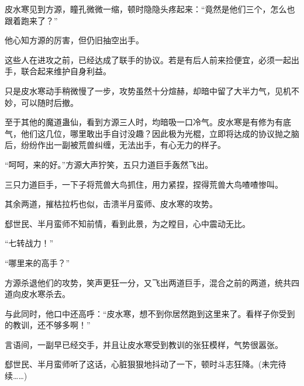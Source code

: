 \begin{this_body}
皮水寒见到方源，瞳孔微微一缩，顿时隐隐头疼起来：“竟然是他们三个，怎么也跟着跑来了？”

他心知方源的厉害，但仍旧抽空出手。

这些人在进攻之前，已经达成了联手的协议。若是有后人前来捡便宜，必须一起出手，联合起来维护自身利益。

只是皮水寒动手稍微慢了一步，攻势虽然十分煊赫，却暗中留了大半力气，见机不妙，可以随时后撤。

至于其他的魔道蛊仙，看到方源三人时，均暗吸一口冷气。皮水寒是有修为有底气，他们这几位，哪里敢出手自讨没趣？因此极为光棍，立即将达成的协议抛之脑后，纷纷作出一副被荒兽纠缠，无法出手，有心无力的样子。

“呵呵，来的好。”方源大声狞笑，五只力道巨手轰然飞出。

三只力道巨手，一下子将荒兽大鸟抓住，用力紧捏，捏得荒兽大鸟喳喳惨叫。

其余两道，摧枯拉朽也似，击溃半月蛮师、皮水寒的攻势。

郄世民、半月蛮师不知前情，看到此景，为之瞠目，心中震动无比。

“七转战力！”

“哪里来的高手？”

方源杀退他们的攻势，笑声更狂一分，又飞出两道巨手，混合之前的两道，统共四道向皮水寒杀去。

与此同时，他口中还高呼：“皮水寒，想不到你居然跑到这里来了。看样子你受到的教训，还不够多啊！”

言语间，一副早已经交手，并且让皮水寒受到教训的张狂模样，气势很嚣张。

郄世民、半月蛮师听了这话，心脏狠狠地抖动了一下，顿时斗志狂降。(未完待续……)

\end{this_body}

